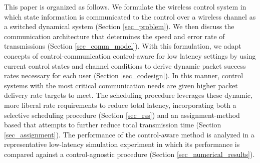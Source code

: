 
This paper is organized as follows. We formulate the wireless control system in which state information is communicated to the control over a wireless channel as a switched dynamical system (Section \ref{sec_problem}). We then discuss the communication architecture that determines the speed and error rate of transmissions (Section \ref{sec_comm_model}). With this formulation, we adapt concepts of control-communication control-aware for low latency settings by using current control states and channel conditions to derive dynamic packet success rates necessary for each user (Section \ref{sec_codesign}). In this manner, control systems with the most critical communication needs are given higher packet delivery rate targets to meet. The scheduling procedure leverages these dynamic, more liberal rate requirements to reduce total latency, incorporating both a selective scheduling procedure  (Section \ref{sec_rss}) and an assignment-method based that attempts to further reduce total transmission time (Section \ref{sec_assignment}). The performance of the control-aware method is analyzed in a representative low-latency simulation experiment in which its performance is compared against a control-agnostic procedure (Section \ref{sec_numerical_results}). 

